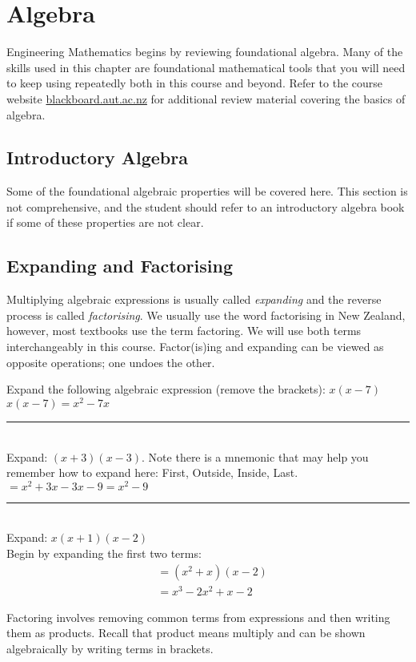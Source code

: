 \chapter{Algebra}
Engineering Mathematics begins by reviewing foundational algebra. Many of the skills used in this chapter are foundational mathematical tools that you will need to keep using repeatedly both in this course and beyond. Refer to the course website \url{blackboard.aut.ac.nz} for additional review material covering the basics of algebra.

\section{Introductory Algebra}\label{sec:introAlgebra}
Some of the foundational algebraic properties will be covered here. This section is not comprehensive, and the student should refer to an introductory algebra book if some of these properties are not clear.
\section*{Expanding and Factorising}
Multiplying algebraic expressions is usually called \emph{expanding}
and the reverse process is called \emph{factorising}. We usually use the word factorising in New Zealand, however, most textbooks use the term factoring. We will use both terms interchangeably in this course. Factor(is)ing and expanding can be viewed as opposite operations; one undoes the other.  

\example Expand the following algebraic expression (remove the brackets): $x(x-7)$\medskip\\
\solution $x(x-7)=x^2-7x$\\
\rule{6.8cm}{0.5pt}\\
\example Expand: $(x+3)(x-3)$. Note there is a mnemonic \textbf{} that may help you remember how to expand here: First, Outside, Inside, Last.\medskip\\
\solution $=x^2+3x-3x-9=x^2-9$\\
\rule{6.8cm}{0.5pt}\\
\example Expand: $x(x+1)(x-2)$\medskip\\
\solution Begin by expanding the first two terms:
\begin{align*} &=(x^2+x)(x-2)\\
&=x^3-2x^2+x-2
\end{align*}

Factoring involves removing common terms from expressions and then writing them as products. Recall that product means multiply and can be shown algebraically by writing terms in brackets. 

